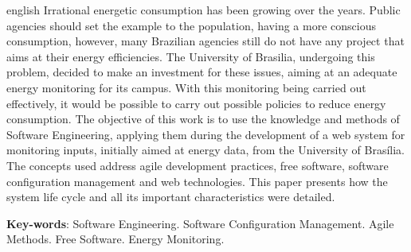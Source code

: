 \begin{resumo}[Abstract]
 \begin{otherlanguage*}{english}
   Irrational energetic consumption has been growing over the years. Public agencies should set the example to the population, having a more conscious consumption, however, many Brazilian agencies still do not have any project that aims at their energy efficiencies. The University of Brasilia, undergoing this problem, decided to make an investment for these issues, aiming at an adequate energy monitoring for its campus. With this monitoring being carried out effectively, it would be possible to carry out possible policies to reduce energy consumption. The objective of this work is to use the knowledge and methods of Software Engineering, applying them during the development of a web system for monitoring inputs, initially aimed at energy data, from the University of Brasília. The concepts used address agile development practices, free software, software configuration management and web technologies. This paper presents how the system life cycle and all its important characteristics were detailed.

   \vspace{\onelineskip}

   \noindent
   \textbf{Key-words}: Software Engineering. Software Configuration Management. Agile Methods. Free Software. Energy Monitoring.
 \end{otherlanguage*}
\end{resumo}
